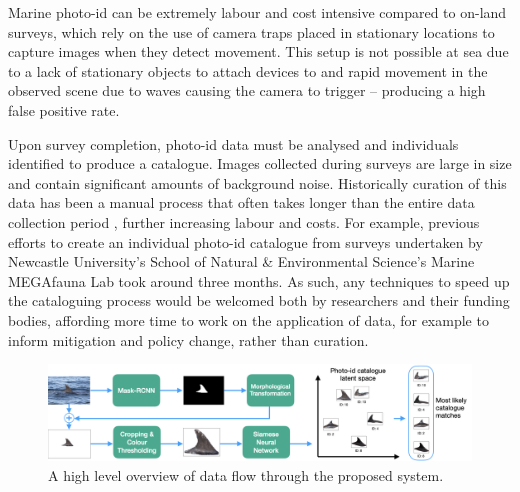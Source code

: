 Marine photo-id can be extremely labour and cost intensive compared to on-land surveys, which rely on the use of camera traps placed in stationary locations to capture images when they detect movement. This setup is not possible at sea due to a lack of stationary objects to attach devices to and rapid movement in the observed scene due to waves causing the camera to trigger -- producing a high false positive rate. 

Upon survey completion, photo-id data must be analysed and individuals identified to produce a catalogue. Images collected during surveys are large in size and contain significant amounts of background noise. Historically curation of this data has been a manual process that often takes longer than the entire data collection period \cite{tyson_moore_rise_2022}, further increasing labour and costs. For example, previous efforts to create an individual photo-id catalogue from surveys undertaken by Newcastle University's School of Natural \& Environmental Science's Marine MEGAfauna Lab took around three months. As such, any techniques to speed up the cataloguing process would be welcomed both by researchers and their funding bodies, affording more time to work on the application of data, for example to inform mitigation and policy change, rather than curation. 

\begin{figure}
	\begin{center}
		\includegraphics[width=\linewidth]{Chapter1/figs/pipeline_compact.png}
	\end{center}
	\caption{A high level overview of data flow through the proposed system.}
	\label{fig:pipeline}
\end{figure}

